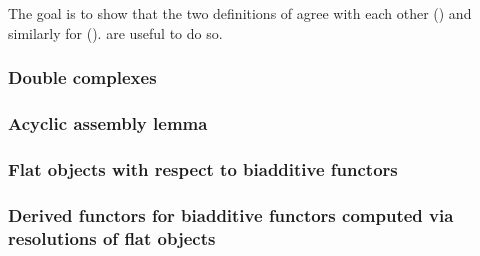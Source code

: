 The goal is to show that the two definitions of  agree with each other () and similarly for  ().  are useful to do so. 



\subsubsection{Double complexes}







\subsubsection{Acyclic assembly lemma}




\subsubsection{Flat objects with respect to biadditive functors}





\subsubsection{Derived functors for biadditive functors computed via resolutions of flat objects} \label{subsubsection:derived_functors_for_biadditive_functors_computed_via_resolutions_of_flat_objects}

